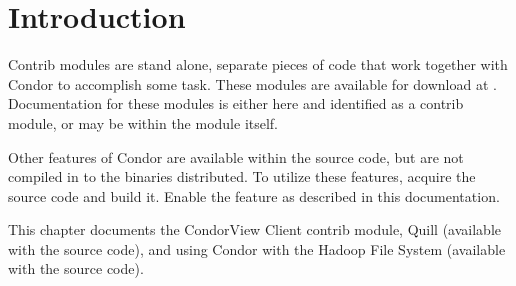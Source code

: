 \section{\label{sec:Contrib-Info}Introduction}

Contrib modules are stand alone, separate pieces of code that work
together with Condor to accomplish some task.
These modules are available for download at 
.
Documentation for these modules is either here and identified
as a contrib module, 
or may be within the module itself.

Other features of Condor are available within the source code,
but are not compiled in to the binaries distributed.
To utilize these features, 
acquire the source code and build it.
Enable the feature as described in this documentation.

This chapter documents the CondorView Client contrib module,
Quill (available with the source code),
and using Condor with the Hadoop File System (available with the source code).





